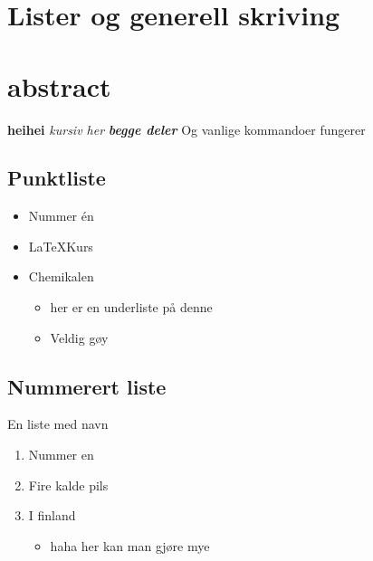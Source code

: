 \section{Lister og generell skriving}
\section*{abstract} %
\textbf{heihei} \textit{kursiv her} \textit{\textbf{begge deler}} Og vanlige kommandoer fungerer

\subsection{Punktliste}

\begin{itemize}
    \item Nummer én
    \item \LaTeX Kurs
    \item Chemikalen
    \begin{itemize}
        \item her er en underliste på denne
        \item Veldig gøy
    \end{itemize}
\end{itemize}

\subsection{Nummerert liste}
En liste med navn
\begin{enumerate}
    \item Nummer en
    \item Fire kalde pils
    \item I finland
    \begin{itemize}
        \item haha her kan man gjøre mye
    \end{itemize}
\end{enumerate}


